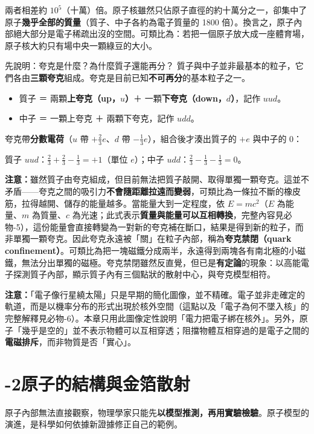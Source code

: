 \documentclass[11pt]{article}
\begin{document}
兩者相差約 $10^{5}$（十萬）倍。原子核雖然只佔原子直徑的約十萬分之一，卻集中了原子\textbf{幾乎全部的質量}（質子、中子各約為電子質量的 1800 倍）。換言之，原子內部絕大部分是電子稀疏出沒的空間。可類比為：若把一個原子放大成一座體育場，原子核大約只有場中央一顆綠豆的大小。

\begin{補充框}{先說明：夸克是什麼？為什麼質子還能再分？}
質子與中子並非最基本的粒子，它們各由\textbf{三顆夸克}組成。夸克是目前已知\textbf{不可再分}的基本粒子之一。
\begin{itemize}\setlength{\itemsep}{1pt}
\item 質子 ＝ 兩顆\textbf{上夸克（up，$u$）}＋ 一顆\textbf{下夸克（down，$d$）}，記作 $uud$。
\item 中子 ＝ 一顆上夸克 ＋ 兩顆下夸克，記作 $udd$。
\end{itemize}
夸克帶\textbf{分數電荷}（$u$ 帶 $+\tfrac23 e$、$d$ 帶 $-\tfrac13 e$），組合後才湊出質子的 $+e$ 與中子的 $0$：

\quad 質子 $uud$：$\tfrac23+\tfrac23-\tfrac13=+1$（單位 $e$）；\qquad 中子 $udd$：$\tfrac23-\tfrac13-\tfrac13=0$。

\textbf{注意：}雖然質子由夸克組成，但目前無法把質子敲開、取得單獨一顆夸克。這並不矛盾——夸克之間的吸引力\textbf{不會隨距離拉遠而變弱}，可類比為一條拉不斷的橡皮筋，拉得越開、儲存的能量越多。當能量大到一定程度，依 $E=mc^2$（$E$ 為能量、$m$ 為質量、$c$ 為光速；此式表示\textbf{質量與能量可以互相轉換}，完整內容見必物-5），這份能量會直接轉變為一對新的夸克補在斷口，結果是得到新的粒子，而非單獨一顆夸克。因此夸克永遠被「關」在粒子內部，稱為\textbf{夸克禁閉（quark confinement）}。可類比為把一塊磁鐵分成兩半，永遠得到兩塊各有南北極的小磁鐵，無法分出單獨的磁極。夸克禁閉雖然反直覺，但已是\textbf{有定論}的現象：以高能電子探測質子內部，顯示質子內有三個點狀的散射中心，與夸克模型相符。
\end{補充框}

\textbf{注意：}「電子像行星繞太陽」只是早期的簡化圖像，並不精確。電子並非走確定的軌道，而是以機率分布的形式出現於核外空間（這點以及「電子為何不墜入核」的完整解釋見必物-6）。本章只用此圖像定性說明「電力把電子綁在核外」。另外，原子「幾乎是空的」並不表示物體可以互相穿透；阻擋物體互相穿過的是電子之間的\textbf{電磁排斥}，而非物質是否「實心」。

\section*{-2\quad 原子的結構與金箔散射}

原子內部無法直接觀察，物理學家只能先\textbf{以模型推測，再用實驗檢驗}。原子模型的演進，是科學如何依據新證據修正自己的範例。
\end{document}
